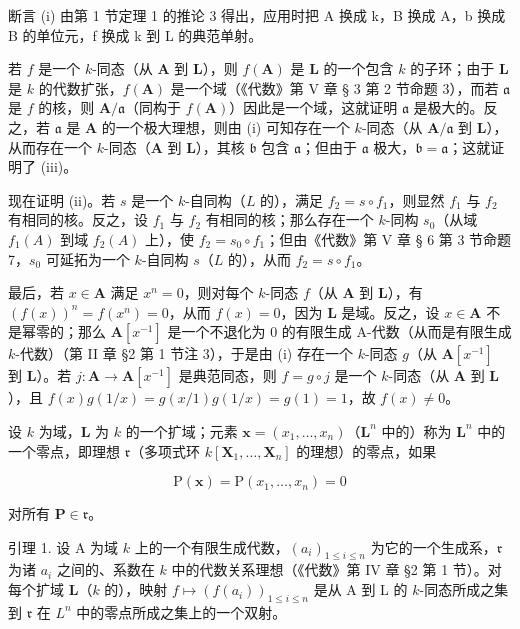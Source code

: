 断言 (i) 由第 1 节定理 1 的推论 3 得出，应用时把 A 换成 k，B 换成 A，b 换成 B 的单位元，f 换成 k 到 L 的典范单射。

若 \(f\) 是一个 \(k\)-同态（从 \(\mathbf{A}\) 到 \(\mathbf{L}\)），则 \(f(\mathbf{A})\) 是 \(\mathbf{L}\) 的一个包含 \(k\) 的子环；由于 \(\mathbf{L}\) 是 \(k\) 的代数扩张，\(f(\mathbf{A})\) 是一个域（《代数》第 V 章 § 3 第 2 节命题 3），而若 \(\mathfrak{a}\) 是 \(f\) 的核，则 \(\mathbf{A} / \mathfrak{a}\)（同构于 \(f(\mathbf{A})\)）因此是一个域，这就证明 \(\mathfrak{a}\) 是极大的。反之，若 \(\mathfrak{a}\) 是 \(\mathbf{A}\) 的一个极大理想，则由 (i) 可知存在一个 \(k\)-同态（从 \(\mathbf{A} / \mathfrak{a}\) 到 \(\mathbf{L}\)），从而存在一个 \(k\)-同态（\(\mathbf{A}\) 到 \(\mathbf{L}\)），其核 \(\mathfrak{b}\) 包含 \(\mathfrak{a}\)；但由于 \(\mathfrak{a}\) 极大，\(\mathfrak{b} = \mathfrak{a}\)；这就证明了 (iii)。

现在证明 (ii)。若 \(s\) 是一个 \(k\)-自同构（\(L\) 的），满足 \(f_2 = s \circ f_1\)，则显然 \(f_1\) 与 \(f_2\) 有相同的核。反之，设 \(f_1\) 与 \(f_2\) 有相同的核；那么存在一个 \(k\)-同构 \(s_0\)（从域 \(f_1(A)\) 到域 \(f_2(A)\) 上），使 \(f_2 = s_0 \circ f_1\)；但由《代数》第 V 章 § 6 第 3 节命题 7，\(s_0\) 可延拓为一个 \(k\)-自同构 \(s\)（\(L\) 的），从而 \(f_2 = s \circ f_1\)。

最后，若 \(x \in \mathbf{A}\) 满足 \(x^n = 0\)，则对每个 \(k\)-同态 \(f\)（从 \(\mathbf{A}\) 到 \(\mathbf{L}\)），有 \((f(x))^n = f(x^n) = 0\)，从而 \(f(x) = 0\)，因为 \(\mathbf{L}\) 是域。反之，设 \(x \in \mathbf{A}\) 不是幂零的；那么 \(\mathbf{A}[x^{-1}]\) 是一个不退化为 0 的有限生成 A-代数（从而是有限生成 \(k\)-代数）（第 II 章 §2 第 1 节注 3），于是由 (i) 存在一个 \(k\)-同态 \(g\)（从 \(\mathbf{A}[x^{-1}]\) 到 \(\mathbf{L}\)）。若 \(j: \mathbf{A} \to \mathbf{A}[x^{-1}]\) 是典范同态，则 \(f = g \circ j\) 是一个 \(k\)-同态（从 \(\mathbf{A}\) 到 \(\mathbf{L}\)），且 \(f(x)g(1/x) = g(x/1)g(1/x) = g(1) = 1\)，故 \(f(x) \neq 0\)。

设 \(k\) 为域，\(\mathbf{L}\) 为 \(k\) 的一个扩域；元素 \(\mathbf{x} = (x_1, \ldots, x_n)\)（\(\mathbf{L}^n\) 中的）称为 \(\mathbf{L}^n\) 中的一个零点，即理想 \(\mathfrak{r}\)（多项式环 \(k[\mathbf{X}_1, \ldots, \mathbf{X}_n]\) 的理想）的零点，如果

\[
\mathrm{P} (\mathbf {x}) = \mathrm{P} (x _ {1}, \dots , x _ {n}) = 0
\]

对所有 \(\mathbf{P} \in \mathfrak{r}\)。

引理 1. 设 A 为域 \(k\) 上的一个有限生成代数，\((a_i)_{1 \leqslant i \leqslant n}\) 为它的一个生成系，\(\mathfrak{r}\) 为诸 \(a_i\) 之间的、系数在 \(k\) 中的代数关系理想（《代数》第 IV 章 §2 第 1 节）。对每个扩域 \(\mathbf{L}\)（\(k\) 的），映射 \(f \mapsto (f(a_i))_{1 \leqslant i \leqslant n}\) 是从 A 到 L 的 \(k\)-同态所成之集到 \(\mathfrak{r}\) 在 \(L^n\) 中的零点所成之集上的一个双射。

